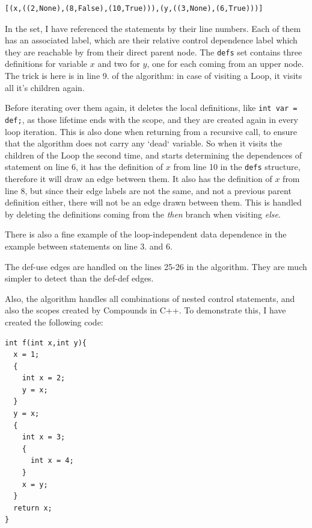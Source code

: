 \documentclass[oneside,12pt,a4paper]{book}
\begin{document}
\lstset{numbers=none}
\begin{lstlisting}
[(x,((2,None),(8,False),(10,True))),(y,((3,None),(6,True)))]
\end{lstlisting}

In the set, I have referenced the statements by their line numbers. Each of them has an associated label, which are their relative control dependence label which they are reachable by from their direct parent node. The \texttt{defs} set contains three definitions for variable $x$ and two for $y$, one for each coming from an upper node. The trick is here is in line 9. of the algorithm: in case of visiting a Loop, it visits all it's children again.

Before iterating over them again, it deletes the local definitions, like \texttt{int var = def;}, as those lifetime ends with the scope, and they are created again in every loop iteration. This is also done when returning from a recursive call, to ensure that the algorithm does not carry any `dead` variable. So when it visits the children of the Loop the second time, and starts determining the dependences of statement on line 6, it has the definition of $x$ from line 10 in the \texttt{defs} structure, therefore it will draw an edge between them. It also has the definition of $x$ from line 8, but since their edge labels are not the same, and not a previous parent definition either, there will not be an edge drawn between them. This is handled by deleting the definitions coming from the \textit{then} branch when visiting \textit{else}. 

There is also a fine example of the loop-independent data dependence in the example between statements on line 3. and 6.

The def-use edges are handled on the lines 25-26 in the algorithm. They are much simpler to detect than the def-def edges.

Also, the algorithm handles all combinations of nested control statements, and also the scopes created by Compounds in C++. To demonstrate this, I have created the following code:
\lstset{numbers=left}
\begin{lstlisting}
int f(int x,int y){
  x = 1;
  {
    int x = 2;
    y = x; 
  }
  y = x;
  {
    int x = 3;
    {
      int x = 4;
    }
    x = y;
  }
  return x;
}
\end{lstlisting}
\end{document}
